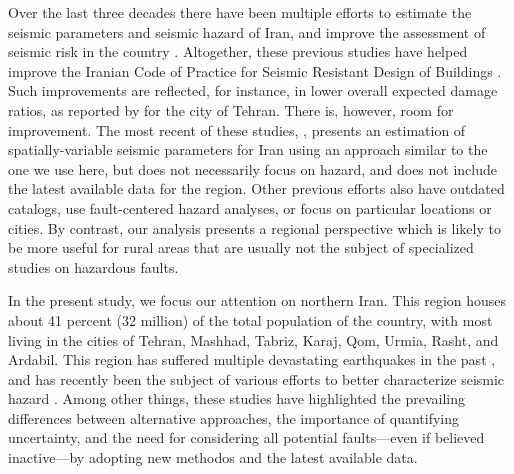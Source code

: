Over the last three decades there have been multiple efforts to estimate the seismic parameters and seismic hazard of Iran, and improve the assessment of seismic risk in the country \citep[e.g.,][]{Tavakoli1999, Moinfar_2000_Chap, Ghodrati2003, Moinfar_2012_WCEE, Khodaverdian_2016_BSSA}. Altogether, these previous studies have helped improve the Iranian Code of Practice for Seismic Resistant Design of Buildings \citep{BHRC2014}. Such improvements are reflected, for instance, in lower overall expected damage ratios, as reported by \citet{Ghodrati2013} for the city of Tehran. There is, however, room for improvement. The most recent of these studies, \citet{Khodaverdian_2016_BSSA}, presents an estimation of spatially-variable seismic parameters for Iran using an approach similar to the one we use here, but does not necessarily focus on hazard, and does not include the latest available data for the region. Other previous efforts also have outdated catalogs, use fault-centered hazard analyses, or focus on particular locations or cities. By contrast, our analysis presents a regional perspective which is likely to be more useful for rural areas that are usually not the subject of specialized studies on hazardous faults.

In the present study, we focus our attention on northern Iran. This region houses about 41 percent (32 million) of the total population of the country, with most living in the cities of Tehran, Mashhad, Tabriz, Karaj, Qom, Urmia, Rasht, and Ardabil. This region has suffered multiple devastating earthquakes in the past \citep[e.g.,][]{Mehrain_1990_Tech, Chafory-Ashtiany_1999_DPM, Razzaghi_2012_Tech}, and has recently been the subject of various efforts to better characterize seismic hazard \citep[e.g.,][]{Abdollahzadeh2014a, Boostan2015}. Among other things, these studies have highlighted the prevailing differences between alternative approaches, the importance of quantifying uncertainty, and the need for considering all potential faults---even if believed inactive---by adopting new methodos and the latest available data.

